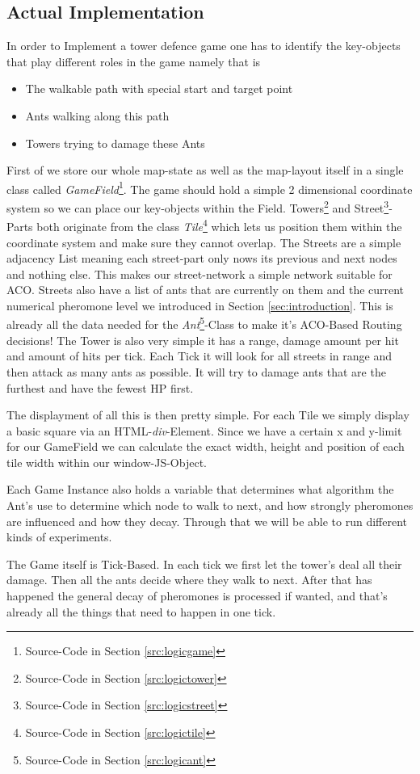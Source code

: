 \subsection{Actual Implementation}
\label{sec:implementationactual}

In order to Implement a tower defence game one has to identify the key-objects that play different roles in the game namely that is
\begin{itemize}
\item The walkable path with special start and target point
\item Ants walking along this path
\item Towers trying to damage these Ants
\end{itemize}
First of we store our whole map-state as well as the map-layout itself in a single class called \textit{GameField}\footnote{Source-Code in Section \ref{src:logicgame}}. The game should hold a simple 2 dimensional coordinate system so we can place our key-objects within the Field. Towers\footnote{Source-Code in Section \ref{src:logictower}} and Street\footnote{Source-Code in Section \ref{src:logicstreet}}-Parts both originate from the class \textit{Tile}\footnote{Source-Code in Section \ref{src:logictile}} which lets us position them within the coordinate system and make sure they cannot overlap.
The Streets are a simple adjacency List meaning each street-part only nows its previous and next nodes and nothing else. This makes our street-network a simple network suitable for ACO. Streets also have a list of ants that are currently on them and the current numerical pheromone level we introduced in Section \ref{sec:introduction}. This is already all the data needed for the \textit{Ant}\footnote{Source-Code in Section \ref{src:logicant}}-Class to make it's ACO-Based Routing decisions!
The Tower is also very simple it has a range, damage amount per hit and amount of hits per tick. Each Tick it will look for all streets in range and then attack as many ants as possible. It will try to damage ants that are the furthest and have the fewest HP first.

The displayment of all this is then pretty simple. For each Tile we simply display a basic square via an HTML-\textit{div}-Element. Since we have a certain x and y-limit for our GameField we can calculate the exact width, height and position of each tile width within our window-JS-Object\cite[P. 570]{goodman2002dynamic}.

Each Game Instance also holds a variable that determines what algorithm the Ant's use to determine which node to walk to next, and how strongly pheromones are influenced and how they decay. Through that we will be able to run different kinds of experiments.

The Game itself is Tick-Based. In each tick we first let the tower's deal all their damage. Then all the ants decide where they walk to next. After that has happened the general decay of pheromones is processed if wanted, and that's already all the things that need to happen in one tick.